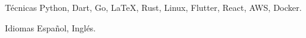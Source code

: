 
\begin{cvskills}

  \cvskill
    {Técnicas} %
    {Python, Dart, Go, LaTeX, Rust, Linux, Flutter, React, AWS, Docker.} %

  \cvskill
    {Idiomas} %
    {Español, Inglés.} %

\end{cvskills}
